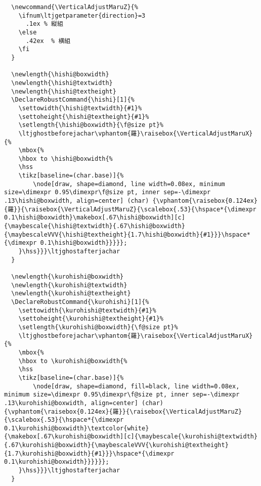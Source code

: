 \documentclass[luatex,fontsize=10pt,paper=b5,twoside]{jlreq}%
\begin{document}
\begin{lstlisting}
  \newcommand{\VerticalAdjustMaruZ}{%
    \ifnum\ltjgetparameter{direction}=3
      .1ex % 縦組
    \else
      .42ex  % 横組
    \fi
  }

  \newlength{\hishi@boxwidth}
  \newlength{\hishi@textwidth}
  \newlength{\hishi@textheight}
  \DeclareRobustCommand{\hishi}[1]{%
    \settowidth{\hishi@textwidth}{#1}%
    \settoheight{\hishi@textheight}{#1}%
    \setlength{\hishi@boxwidth}{\f@size pt}%
    \ltjghostbeforejachar\vphantom{羅}\raisebox{\VerticalAdjustMaruX}{%
    \mbox{%
    \hbox to \hishi@boxwidth{%
    \hss
    \tikz[baseline=(char.base)]{%
        \node[draw, shape=diamond, line width=0.08ex, minimum size=\dimexpr 0.95\dimexpr\f@size pt, inner sep=-\dimexpr .13\hishi@boxwidth, align=center] (char) {\vphantom{\raisebox{0.124ex}{羅}}{\raisebox{\VerticalAdjustMaruZ}{\scalebox{.53}{\hspace*{\dimexpr 0.1\hishi@boxwidth}\makebox[.67\hishi@boxwidth][c]{\maybescale{\hishi@textwidth}{.67\hishi@boxwidth}{\maybescaleVVV{\hishi@textheight}{1.7\hishi@boxwidth}{#1}}}\hspace*{\dimexpr 0.1\hishi@boxwidth}}}}};
    }\hss}}}\ltjghostafterjachar
  }

  \newlength{\kurohishi@boxwidth}
  \newlength{\kurohishi@textwidth}
  \newlength{\kurohishi@textheight}
  \DeclareRobustCommand{\kurohishi}[1]{%
    \settowidth{\kurohishi@textwidth}{#1}%
    \settoheight{\kurohishi@textheight}{#1}%
    \setlength{\kurohishi@boxwidth}{\f@size pt}%
    \ltjghostbeforejachar\vphantom{羅}\raisebox{\VerticalAdjustMaruX}{%
    \mbox{%
    \hbox to \kurohishi@boxwidth{%
    \hss
    \tikz[baseline=(char.base)]{%
        \node[draw, shape=diamond, fill=black, line width=0.08ex, minimum size=\dimexpr 0.95\dimexpr\f@size pt, inner sep=-\dimexpr .13\kurohishi@boxwidth, align=center] (char) {\vphantom{\raisebox{0.124ex}{羅}}{\raisebox{\VerticalAdjustMaruZ}{\scalebox{.53}{\hspace*{\dimexpr 0.1\kurohishi@boxwidth}\textcolor{white}{\makebox[.67\kurohishi@boxwidth][c]{\maybescale{\kurohishi@textwidth}{.67\kurohishi@boxwidth}{\maybescaleVVV{\kurohishi@textheight}{1.7\kurohishi@boxwidth}{#1}}}\hspace*{\dimexpr 0.1\kurohishi@boxwidth}}}}}};
    }\hss}}}\ltjghostafterjachar
  }


\end{lstlisting}
\end{document}

